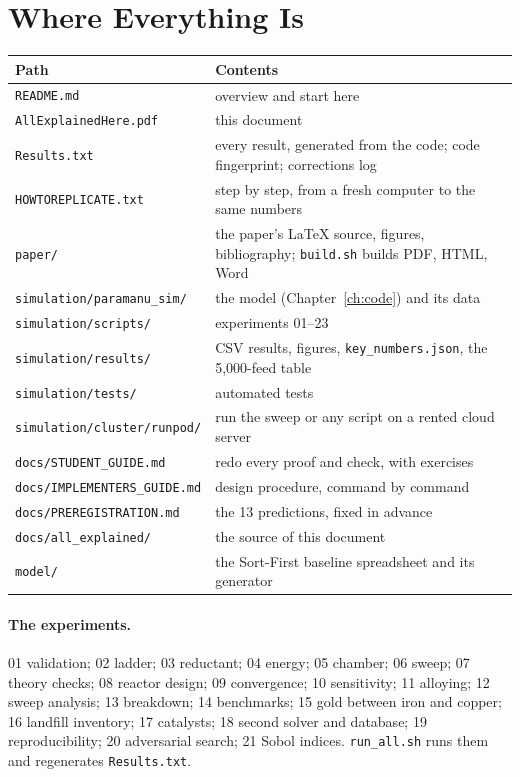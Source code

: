 \documentclass[11pt,a4paper]{article}
\begin{document}
\section{Where Everything Is}
\begin{center}
\small
\begin{tabular}{@{}>{\raggedright\arraybackslash}p{4.6cm}>{\raggedright\arraybackslash}p{10cm}@{}}
\toprule
\textbf{Path} & \textbf{Contents} \\
\midrule
\texttt{README.md} & overview and start here \\
\texttt{AllExplainedHere.pdf} & this document \\
\texttt{Results.txt} & every result, generated from the code; code fingerprint; corrections log \\
\texttt{HOWTOREPLICATE.txt} & step by step, from a fresh computer to the same numbers \\
\texttt{paper/} & the paper's LaTeX source, figures, bibliography; \texttt{build.sh} builds PDF, HTML, Word \\
\texttt{simulation/paramanu\_sim/} & the model (Chapter~\ref{ch:code}) and its data \\
\texttt{simulation/scripts/} & experiments 01--23 \\
\texttt{simulation/results/} & CSV results, figures, \texttt{key\_numbers.json}, the 5,000-feed table \\
\texttt{simulation/tests/} & 38 automated tests \\
\texttt{simulation/cluster/runpod/} & run the sweep or any script on a rented cloud server \\
\texttt{docs/STUDENT\_GUIDE.md} & redo every proof and check, with exercises \\
\texttt{docs/IMPLEMENTERS\_GUIDE.md} & design procedure, command by command \\
\texttt{docs/PREREGISTRATION.md} & the 13 predictions, fixed in advance \\
\texttt{docs/all\_explained/} & the source of this document \\
\texttt{model/} & the Sort-First baseline spreadsheet and its generator \\
\bottomrule
\end{tabular}
\end{center}

\paragraph{The experiments.} 01 validation; 02 ladder; 03 reductant; 04 energy; 05 chamber; 06 sweep; 07 theory checks; 08 reactor design; 09 convergence; 10 sensitivity; 11 alloying; 12 sweep analysis; 13 breakdown; 14 benchmarks; 15 gold between iron and copper; 16 landfill inventory; 17 catalysts; 18 second solver and database; 19 reproducibility; 20 adversarial search; 21 Sobol indices. \texttt{run\_all.sh} runs them and regenerates \texttt{Results.txt}.
\end{document}

